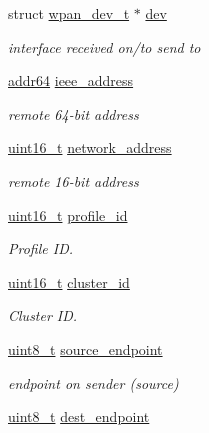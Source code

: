 \begin{DoxyCompactItemize}
\item 
struct \hyperlink{structwpan__dev__t}{wpan\+\_\+dev\+\_\+t} $\ast$ \hyperlink{group__wpan__aps_ga7f9a38312b9025348d42a4ed0042ce37}{dev}
\begin{DoxyCompactList}\small\item\em interface received on/to send to \end{DoxyCompactList}\item 
\hyperlink{unionaddr64}{addr64} \hyperlink{group__wpan__aps_ga2549f921e25a72dfa05a2154a792e2bf}{ieee\+\_\+address}
\begin{DoxyCompactList}\small\item\em remote 64-\/bit address \end{DoxyCompactList}\item 
\hyperlink{group__hal__dos_ga5a8b2dc9e45a9ee81a94ef304fb62505}{uint16\+\_\+t} \hyperlink{group__wpan__aps_ga30948a7f8d096191895f50b80d81ca12}{network\+\_\+address}
\begin{DoxyCompactList}\small\item\em remote 16-\/bit address \end{DoxyCompactList}\item 
\hyperlink{group__hal__dos_ga5a8b2dc9e45a9ee81a94ef304fb62505}{uint16\+\_\+t} \hyperlink{group__wpan__aps_ga5ca7f19e5697de2baf0e2147a41a5792}{profile\+\_\+id}
\begin{DoxyCompactList}\small\item\em Profile ID. \end{DoxyCompactList}\item 
\hyperlink{group__hal__dos_ga5a8b2dc9e45a9ee81a94ef304fb62505}{uint16\+\_\+t} \hyperlink{group__wpan__aps_ga262a92f94287e77cb56350951893bae2}{cluster\+\_\+id}
\begin{DoxyCompactList}\small\item\em Cluster ID. \end{DoxyCompactList}\item 
\hyperlink{group__hal__dos_gae1affc9ca37cfb624959c866a73f83c2}{uint8\+\_\+t} \hyperlink{group__wpan__aps_ga9781a5a281ee97f7f67d8ebe2c4f54db}{source\+\_\+endpoint}
\begin{DoxyCompactList}\small\item\em endpoint on sender (source) \end{DoxyCompactList}\item 
\hyperlink{group__hal__dos_gae1affc9ca37cfb624959c866a73f83c2}{uint8\+\_\+t} \hyperlink{group__wpan__aps_ga0992896b3999455a300e8ba25c368ae8}{dest\+\_\+endpoint}

\end{DoxyCompactItemize}
